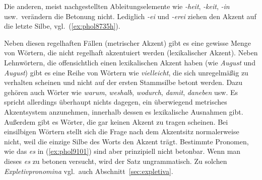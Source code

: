 

Die anderen, meist nachgestellten Ableitungselemente wie \textit{-heit}, \textit{-keit}, \textit{-in} usw.\ verändern die Betonung nicht.
Lediglich \textit{-ei} und \textit{-erei} ziehen den Akzent auf die letzte Silbe, vgl.\ (\ref{ex:phol8735h}).

Neben diesen regelhaften Fällen (metrischer Akzent) gibt es eine gewisse Menge von Wörtern, die nicht regelhaft akzentuiert werden (lexikalischer Akzent).
Neben Lehnwörtern, die offensichtlich einen lexikalischen Akzent haben (wie \textit{\Akz August} und \textit{Au\Akz gust}) gibt es eine Reihe von Wörtern wie \textit{vie\Akz lleicht}, die sich unregelmäßig zu verhalten scheinen und nicht auf der ersten Stammsilbe betont werden.
Dazu gehören auch Wörter wie \textit{wa\Akz rum}, \textit{wes\Akz halb}, \textit{wo\Akz durch}, \textit{da\Akz mit}, \textit{da\Akz neben} usw.
Es spricht allerdings überhaupt nichts dagegen, ein überwiegend metrisches Akzentsystem anzunehmen, innerhalb dessen es lexikalische Ausnahmen gibt.
Außerdem gibt es Wörter, die gar keinen Akzent zu tragen scheinen.
Bei einsilbigen Wörtern stellt sich die Frage nach dem Akzentsitz normalerweise nicht, weil die einzige Silbe des Worts den Akzent trägt.
Bestimmte Pronomen, wie das \textit{es} in (\ref{ex:phol9101}) sind aber prinzipiell nicht betonbar.
Wenn man dieses \textit{es} zu betonen versucht, wird der Satz ungrammatisch.
Zu solchen \textit{Expletivpronomina} vgl.\ auch Abschnitt~\ref{sec:expletiva}.\label{abs:expletbeton}

\begin{exe}
  \ex\label{ex:phol9101}
  \begin{xlist}
  \end{xlist}
\end{exe}

